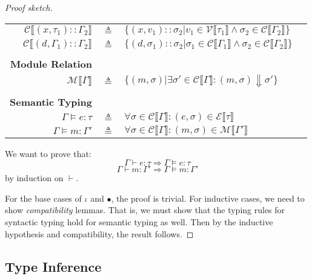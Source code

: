 \documentclass{article}
\theoremstyle{definition}
\newcommand*{\cons}{::}
\newcommand*{\modid}{d}
\newcommand*{\ctx}{\sigma}
\newcommand*{\semarrow}{\Downarrow}
\newcommand*{\sembracket}[1]{\lBrack{#1}\rBrack}
\newcommand*{\ValRel}[1]{\mathcal{V}\sembracket{#1}}
\newcommand*{\ExprRel}[1]{\mathcal{E}\sembracket{#1}}
\newcommand*{\CtxRel}[1]{\mathcal{C}\sembracket{#1}}
\newcommand*{\ModRel}[1]{\mathcal{M}\sembracket{#1}}
\begin{document}
\begin{proof}[Proof sketch]
\begin{tabular}{rclr}
		$\CtxRel{(x,\tau_1)\cons\Gamma_2}$        & $\triangleq$ & $\{(x,v_1)\cons\ctx_2|v_1\in\ValRel{\tau_1}\land\ctx_2\in\CtxRel{\Gamma_2}\}$                                                                                     \\
		$\CtxRel{(\modid,\Gamma_1)\cons\Gamma_2}$ & $\triangleq$ & $\{(\modid,\ctx_1)\cons\ctx_2|\ctx_1\in\CtxRel{\Gamma_1}\land\ctx_2\in\CtxRel{\Gamma_2}\}$                                                                        \\
		\\
		\textbf{Module Relation}                  &              &                                                                                                        & \fbox{$\ModRel{\Gamma}$}                                 \\
		$\ModRel{\Gamma}$                         & $\triangleq$ & $\{(m,\ctx)|\exists\ctx'\in\CtxRel{\Gamma}:(m,\ctx)\semarrow\ctx'\}$                                                                                              \\
		\\
		\textbf{Semantic Typing}                  &              &                                                                                                        & \fbox{$\Gamma\vDash e:\tau$ and $\Gamma\vDash m:\Gamma$} \\
		$\Gamma\vDash e:\tau$                     & $\triangleq$ & $\forall\ctx\in\CtxRel{\Gamma}:(e,\ctx)\in\ExprRel{\tau}$                                                                                                         \\
		$\Gamma\vDash m:\Gamma'$                  & $\triangleq$ & $\forall\ctx\in\CtxRel{\Gamma}:(m,\ctx)\in\ModRel{\Gamma'}$
	\end{tabular}

	\vphantom{}

	We want to prove that:
	\[\Gamma\vdash e:\tau\Rightarrow\Gamma\vDash e:\tau\]
	\[\Gamma\vdash m:\Gamma'\Rightarrow\Gamma\vDash m:\Gamma'\]
	by induction on $\vdash$.

	For the base cases of $\iota$ and $\bullet$, the proof is trivial.
	For inductive cases, we need to show \emph{compatibility} lemmas.
	That is, we must show that the typing rules for syntactic typing hold for semantic typing as well.
	Then by the inductive hypothesis and compatibility, the result follows.
\end{proof}

\subsection{Type Inference}
\end{document}
